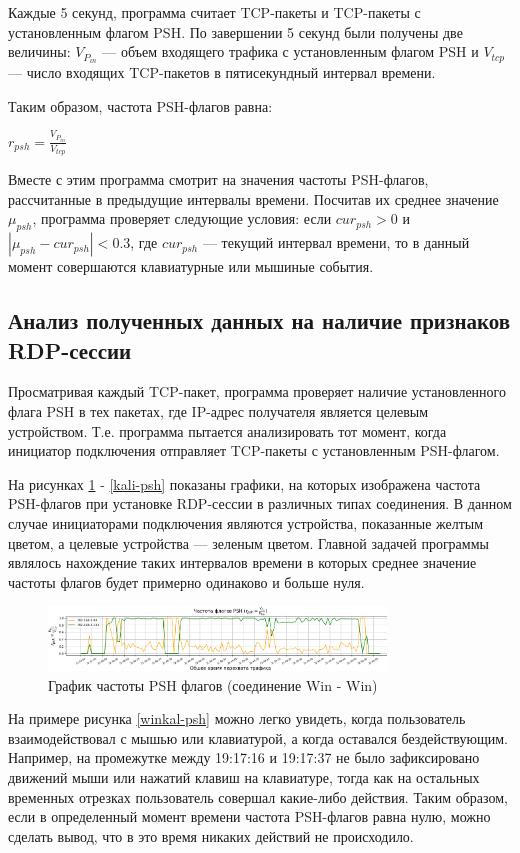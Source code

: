 \documentclass[bachelor, och, coursework]{SCWorks}
\begin{document}
Каждые 5 секунд, программа считает TCP-пакеты и TCP-пакеты с установленным флагом PSH. По завершении
5 секунд были получены две величины: $V_{P_{in}}$ --- объем входящего трафика с установленным флагом PSH и $V_{tcp}$ --- число входящих
TCP-пакетов в пятисекундный интервал времени.

Таким образом, частота PSH-флагов равна:
\begin{center}
  $r_{psh} = \frac{V_{P_{in}}}{V_{tcp}}$
\end{center} 

Вместе с этим программа смотрит на значения частоты PSH-флагов, рассчитанные в предыдущие интервалы времени. Посчитав их среднее значение $\mu_{psh}$,
программа проверяет следующие условия: если $cur_{psh} > 0$ и $| \mu_{psh} - cur_{psh}| < 0.3$, где $cur_{psh}$ --- текущий интервал времени, то 
в данный момент совершаются клавиатурные или мышиные события.


\subsection{Анализ полученных данных на наличие признаков RDP-сессии}

Просматривая каждый TCP-пакет, программа проверяет наличие установленного флага PSH в тех пакетах, где IP-адрес 
получателя является целевым устройством. Т.е. программа пытается анализировать тот момент, когда инициатор подключения
отправляет TCP-пакеты с установленным PSH-флагом.


На рисунках \ref{win-psh} - \ref{kali-psh} показаны графики, на которых изображена частота PSH-флагов при установке RDP-сессии 
в различных типах соединения. В данном случае инициаторами подключения являются устройства, показанные желтым цветом, а целевые устройства --- 
зеленым цветом. Главной задачей программы являлось нахождение таких интервалов времени в которых среднее значение частоты флагов будет примерно
одинаково и больше нуля.

\begin{figure}[H]
  \centering
  \includegraphics[width=0.8\textwidth]{photo/psh-win.png}
  \caption{График частоты PSH флагов (соединение Win - Win)}
  \label{win-psh}
\end{figure}

На примере рисунка \ref{winkal-psh} можно легко увидеть, когда пользователь взаимодействовал с мышью или клавиатурой, а когда оставался 
бездействующим. Например, на промежутке между 19:17:16 и 19:17:37 не было зафиксировано движений мыши или нажатий клавиш на клавиатуре, 
тогда как на остальных временных отрезках пользователь совершал какие-либо действия. Таким образом, если в определенный момент времени 
частота PSH-флагов равна нулю, можно сделать вывод, что в это время никаких действий не происходило.
\end{document}
